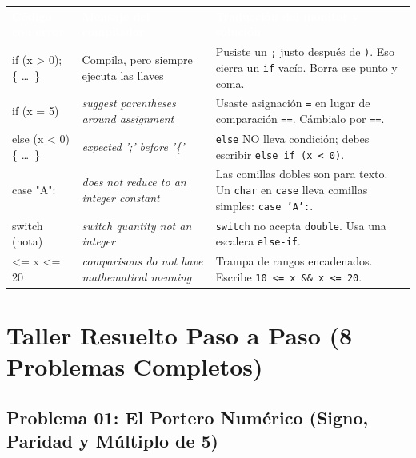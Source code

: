 \documentclass[11pt,letterpaper]{article}
\begin{document}
\begin{center}
  \small
  \renewcommand{\arraystretch}{1.28}
  \begin{tabularx}{\linewidth}{>{\ttfamily\footnotesize\raggedright\arraybackslash}p{3.6cm} >{\raggedright\arraybackslash}p{4.4cm} X}
    \rowcolor{RojoAlerta}
    \textcolor{white}{\textbf{\sffamily Código con error}} &
    \textcolor{white}{\textbf{Mensaje del compilador}} &
    \textcolor{white}{\textbf{Traducción del monitor y solución}} \\
    if (x > 0); \{ \dots\ \} & Compila, pero siempre ejecuta las llaves & Pusiste un \texttt{;} justo después de \texttt{)}. Eso cierra un \texttt{if} vacío. Borra ese punto y coma. \\
    if (x = 5) & \textit{suggest parentheses around assignment} & Usaste asignación \texttt{=} en lugar de comparación \texttt{==}. Cámbialo por \texttt{==}. \\
    else (x < 0) \{ \dots\ \} & \textit{expected ';' before '\{'} & \texttt{else} NO lleva condición; debes escribir \texttt{else if (x < 0)}. \\
    case "A": & \textit{does not reduce to an integer constant} & Las comillas dobles son para texto. Un \texttt{char} en \texttt{case} lleva comillas simples: \texttt{case 'A':}. \\
    switch (nota) & \textit{switch quantity not an integer} & \texttt{switch} no acepta \texttt{double}. Usa una escalera \texttt{else-if}. \\
    10 <= x <= 20 & \textit{comparisons do not have mathematical meaning} & Trampa de rangos encadenados. Escribe \texttt{10 <= x \&\& x <= 20}. \\
    \bottomrule
  \end{tabularx}
\end{center}

\section{Taller Resuelto Paso a Paso (8 Problemas Completos)}

\subsection{Problema 01: El Portero Numérico (Signo, Paridad y Múltiplo de 5)}
\end{document}
